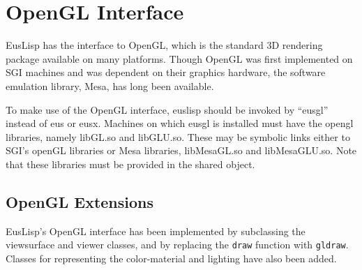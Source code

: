 \section{OpenGL Interface}
EusLisp has the interface to OpenGL, which is the standard
3D rendering package available on many platforms.
Though OpenGL was first implemented on SGI machines and was
dependent on their graphics hardware, 
the software emulation library, Mesa, has long been available.

To make use of the OpenGL interface,
euslisp should be invoked by ``eusgl'' instead of eus or eusx.
Machines on which eusgl is installed must have the opengl libraries,
namely libGL.so and libGLU.so. These may be symbolic links
either to SGI's openGL libraries or Mesa libraries, libMesaGL.so
and libMesaGLU.so.  Note that these libraries must be provided
in the shared object.


\subsection{OpenGL Extensions}

EusLisp's OpenGL interface has been implemented by subclassing
the viewsurface and viewer classes,
and by replacing the {\tt draw} function with {\tt gldraw}.
Classes for representing the color-material and lighting have also
been added.





